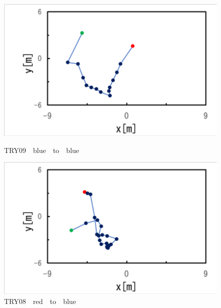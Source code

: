 \begin{figure}[ht]
  \begin{center}
    
    \includegraphics[clip,width=15.0cm]{figure/TRY09_blue_to_blue.eps}
    \caption{TRY09　blue　to　blue}
    \label{fig:try09}
    
    \includegraphics[width=15.0cm]{figure/TRY10_red_to_blue.eps}
    \caption{TRY08　red　to　blue}
    \label{ig:try010}
    
  \end{center}
\end{figure}

